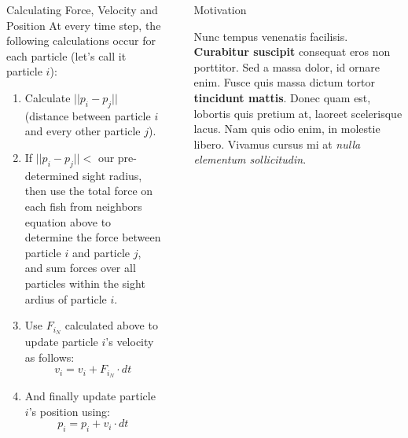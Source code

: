 \documentclass[final, xcolor=dvipsnames]{beamer}
\newlength{\sepwid}
\newlength{\onecolwid}
\newlength{\twocolwid}
\begin{document}
\begin{frame}[t]
\begin{columns}[t]
\begin{column}{\twocolwid}
\begin{columns}[t,totalwidth=\twocolwid]
\begin{column}{\onecolwid}
\begin{block}{Calculating Force, Velocity and Position}
At every time step, the following calculations occur for each particle (let's call it particle $i$):
\begin{enumerate}
	\item Calculate $|| p_{i} - p_{j}||$ (distance between particle $i$ and every other particle $j$).
	\item If $||p_{i} - p_{j}|| <$ our pre-determined sight radius, then use the total force on each fish from neighbors equation above to determine the force between particle $i$ and particle $j$, and sum forces over all particles within the sight ardius of particle $i$.
	\item Use $F_{i_{N}}$ calculated above to update particle $i$'s velocity as follows:
		\begin{equation*}
			v_{i} = v_{i} + F_{i_{N}}\cdot dt
		\end{equation*}
	\item And finally update particle $i$'s position using:
		\begin{equation*}
			p_{i} = p_{i} + v_{i} \cdot dt
		\end{equation*}
\end{enumerate}

\end{block}


\end{column} %

\end{columns} %

\end{column} %

\begin{column}{\sepwid}\end{column} %

\begin{column}{\onecolwid} %


\begin{block}{Motivation}

Nunc tempus venenatis facilisis. \textbf{Curabitur suscipit} consequat eros non porttitor. Sed a massa dolor, id ornare enim. Fusce quis massa dictum tortor \textbf{tincidunt mattis}. Donec quam est, lobortis quis pretium at, laoreet scelerisque lacus. Nam quis odio enim, in molestie libero. Vivamus cursus mi at \textit{nulla elementum sollicitudin}.


\end{block}
\end{column}
\end{columns}
\end{frame}
\end{document}
